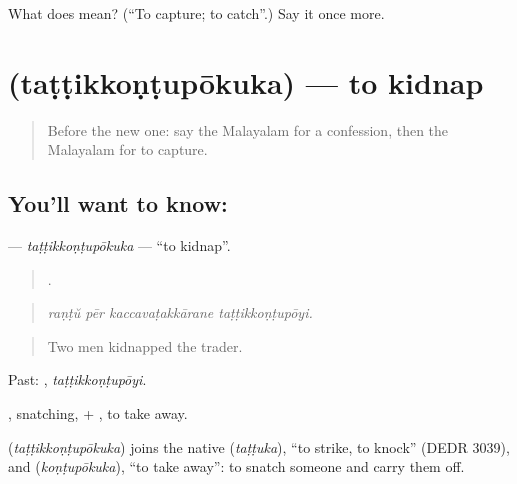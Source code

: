 \begin{tcolorbox}[breakable,colback=teal!4,colframe=teal!35!black,title={Before you move on}]
What does  mean? (\textquotedblleft{}To capture; to catch\textquotedblright{}.) Say it once more.
\end{tcolorbox}
\section[\texorpdfstring{\ml{തട്ടിക്കൊണ്ടുപോകുക} (taṭṭikkoṇṭupōkuka)}{തട്ടിക്കൊണ്ടുപോകുക (taṭṭikkoṇṭupōkuka)}]{ (taṭṭikkoṇṭupōkuka) — to kidnap}

\label{lesson:ML-C367-tattikkontupokuka}



\begin{quote}
Before the new one: say the Malayalam for a confession, then the Malayalam for to capture.
\end{quote}

\subsection*{You'll want to know: }
\textbf{} — \emph{taṭṭikkoṇṭupōkuka} — \textquotedblleft{}to kidnap\textquotedblright{}.

\begin{quote}
   .
\end{quote}

\begin{quote}
\emph{raṇṭŭ pēr kaccavaṭakkārane taṭṭikkoṇṭupōyi.}
\end{quote}

\begin{quote}
Two men kidnapped the trader.
\end{quote}

Past: , \emph{taṭṭikkoṇṭupōyi}.

, snatching, + , to take away.

\begin{cousinweb}
\textbf{} (\emph{taṭṭikkoṇṭupōkuka}) joins the native  (\emph{taṭṭuka}), \textquotedblleft{}to strike, to knock\textquotedblright{} (DEDR 3039), and  (\emph{koṇṭupōkuka}), \textquotedblleft{}to take away\textquotedblright{}: to snatch someone and carry them off.
\end{cousinweb}


